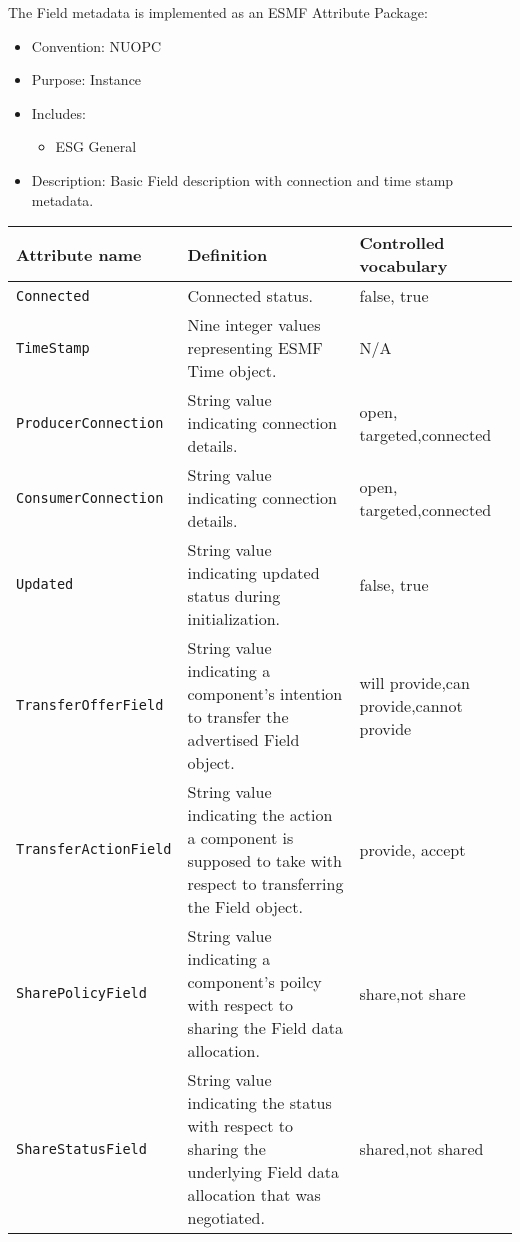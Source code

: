 \label{FieldMeta}
The Field metadata is implemented as an ESMF Attribute Package:

\begin{itemize}
    \item Convention: NUOPC
    \item Purpose: Instance
    \item Includes:
    \begin{itemize}
        \item ESG General
    \end{itemize} 
    \item Description: Basic Field description with connection and time stamp metadata. 
\end{itemize}

\begin{tabular}{|p{5cm}|p{5cm}|p{35mm}|}
     \hline\hline
     {\bf Attribute name} & {\bf Definition} & {\bf Controlled vocabulary}\\
     \hline\hline
     {\tt Connected} & Connected status.& false, true\\ \hline
     {\tt TimeStamp} & Nine integer values representing ESMF Time object.& N/A\\ \hline
     {\tt ProducerConnection} & String value indicating connection details.& open, targeted,\newline connected\\ \hline
     {\tt ConsumerConnection} & String value indicating connection details.& open, targeted,\newline connected\\ \hline
     {\tt Updated} & String value indicating updated status during initialization.& false, true\\ \hline
     {\tt TransferOfferField} & String value indicating a component's intention to transfer the advertised Field object.& will provide,\newline can provide,\newline cannot provide\\ \hline
     {\tt TransferActionField} & String value indicating the action a component is supposed to take with respect to transferring the Field object.& provide, accept\\ \hline
     {\tt SharePolicyField} & String value indicating a component's poilcy with respect to sharing the Field data allocation.& share,\newline not share\\ \hline
     {\tt ShareStatusField} & String value indicating the status with respect to sharing the underlying Field data allocation that was negotiated.& shared,\newline not shared\\ \hline

\end{tabular}

